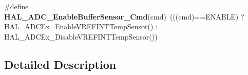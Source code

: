 \begin{DoxyCompactItemize}
\item 
\#define {\bfseries H\+A\+L\+\_\+\+A\+D\+C\+\_\+\+Enable\+Buffer\+Sensor\+\_\+\+Cmd}(cmd)~(((cmd)==E\+N\+A\+B\+LE) ?  H\+A\+L\+\_\+\+A\+D\+C\+Ex\+\_\+\+Enable\+V\+R\+E\+F\+I\+N\+T\+Temp\+Sensor() \+: H\+A\+L\+\_\+\+A\+D\+C\+Ex\+\_\+\+Disable\+V\+R\+E\+F\+I\+N\+T\+Temp\+Sensor())\hypertarget{group___h_a_l___aliased___functions_ga674bce235a7be59ff19cca605b2e3ce8}{}\label{group___h_a_l___aliased___functions_ga674bce235a7be59ff19cca605b2e3ce8}

\end{DoxyCompactItemize}


\subsection{Detailed Description}
